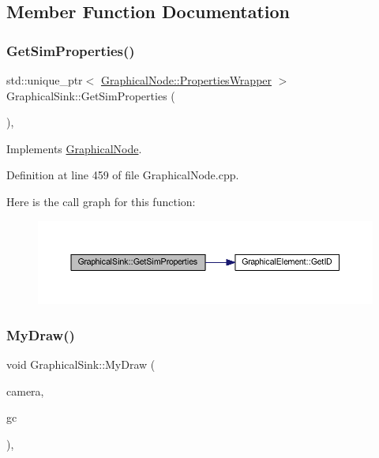 \subsection{Member Function Documentation}
\mbox{\label{class_graphical_sink_a7e8f63afb0f7ddf14c77cac9e44d30d4}} 
\subsubsection{\texorpdfstring{Get\+Sim\+Properties()}{GetSimProperties()}}
{\footnotesize\ttfamily std\+::unique\+\_\+ptr$<$ \hyperlink{class_graphical_node_1_1_properties_wrapper}{Graphical\+Node\+::\+Properties\+Wrapper} $>$ Graphical\+Sink\+::\+Get\+Sim\+Properties (\begin{DoxyParamCaption}{ }\end{DoxyParamCaption})\hspace{0.3cm}{\ttfamily [override]}, {\ttfamily [virtual]}}



Implements \hyperlink{class_graphical_node_a2ad6386709ceabfbf97daabf4c6cd64a}{Graphical\+Node}.



Definition at line 459 of file Graphical\+Node.\+cpp.

Here is the call graph for this function\+:
\nopagebreak
\begin{figure}[H]
\begin{center}
\leavevmode
\includegraphics[width=350pt]{class_graphical_sink_a7e8f63afb0f7ddf14c77cac9e44d30d4_cgraph}
\end{center}
\end{figure}
\mbox{\label{class_graphical_sink_abac58f5bfe23ab2a799560171c036507}} 
\subsubsection{\texorpdfstring{My\+Draw()}{MyDraw()}}
{\footnotesize\ttfamily void Graphical\+Sink\+::\+My\+Draw (\begin{DoxyParamCaption}\item[{const wx\+Affine\+Matrix2D \&}]{camera,  }\item[{wx\+Graphics\+Context $\ast$}]{gc }\end{DoxyParamCaption})\hspace{0.3cm}{\ttfamily [override]}, {\ttfamily [virtual]}}



